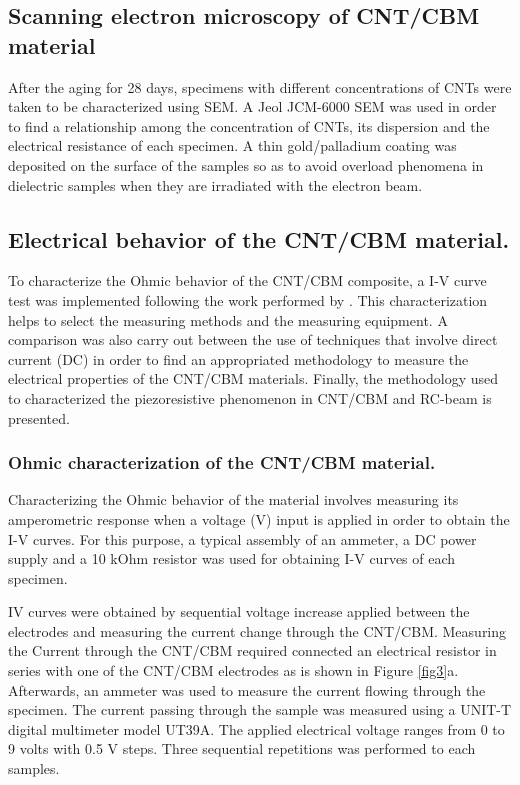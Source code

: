 \documentclass[twocolumn]{bmcart}%
\begin{document}
\subsection{Scanning electron microscopy of CNT/CBM material}
After the aging for 28 days, specimens with different concentrations of CNTs were taken to be characterized using SEM. A Jeol JCM-6000 SEM was used in order to find a relationship among the concentration of CNTs, its dispersion and the electrical resistance of each specimen. A thin gold/palladium coating was deposited on the surface of the samples so as to avoid overload phenomena in dielectric samples when they are irradiated with the electron beam.

\subsection{Electrical behavior of the CNT/CBM material.}

To characterize the Ohmic behavior of the CNT/CBM composite, a I-V curve test  was implemented following the work performed by \cite{Han2015a}. This characterization helps to select the measuring methods and the measuring equipment. A comparison was also carry out between the use of techniques that involve direct current (DC) in order to find an appropriated methodology to measure the electrical properties of the CNT/CBM materials. Finally, the methodology used to characterized the piezoresistive phenomenon in CNT/CBM and RC-beam is presented.

\subsubsection{Ohmic characterization of the CNT/CBM material.}

Characterizing the Ohmic behavior of the material involves measuring its  amperometric response when a voltage (V) input is applied in order to obtain the I-V curves. For this purpose, a typical assembly \cite{YORKE1981200} of an ammeter, a DC power supply and a 10 kOhm resistor was used for obtaining I-V curves of each specimen.


IV curves were obtained by sequential voltage increase applied between the electrodes and measuring the current change through the CNT/CBM. Measuring the Current through the CNT/CBM required connected an electrical resistor in series with one of the CNT/CBM electrodes as is shown in Figure \ref{fig3}a. Afterwards, an ammeter was used to measure the current flowing through the specimen. The current passing through the sample was measured using a UNIT-T digital multimeter model UT39A. The applied electrical voltage ranges from 0 to 9 volts with 0.5 V steps. Three sequential repetitions was performed to each samples.
\end{document}
